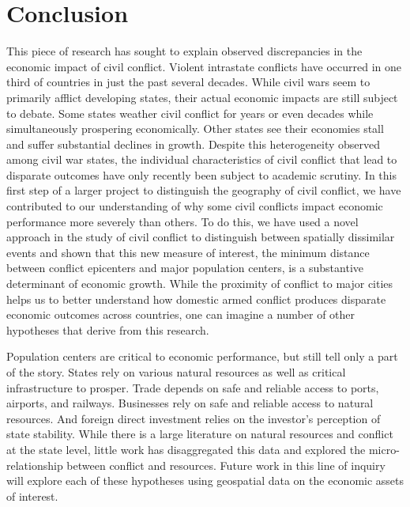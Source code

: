 \section{Conclusion}
\label{conclusion}

This piece of research has sought to explain observed discrepancies in the economic impact of civil conflict. Violent intrastate conflicts have occurred in one third of countries in just the past several decades. While civil wars seem to primarily afflict developing states, their actual economic impacts are still subject to debate. Some states weather civil conflict for years or even decades while simultaneously prospering economically. Other states see their economies stall and suffer substantial declines in growth. Despite this heterogeneity observed among civil war states, the individual characteristics of civil conflict that lead to disparate outcomes have only recently been subject to academic scrutiny. In this first step of a larger project to distinguish the geography of civil conflict, we have contributed to our understanding of why some civil conflicts impact economic performance more severely than others. To do this, we have used a novel approach in the study of civil conflict to distinguish between spatially dissimilar events and shown that this new measure of interest, the minimum distance between conflict epicenters and major population centers, is a substantive determinant of economic growth. While the proximity of conflict to major cities helps us to better understand how domestic armed conflict produces disparate economic outcomes across countries, one can imagine a number of other hypotheses that derive from this research.

Population centers are critical to economic performance, but still tell only a part of the story. States rely on various natural resources as well as critical infrastructure to prosper. Trade depends on safe and reliable access to ports, airports, and railways. Businesses rely on safe and reliable access to natural resources. And foreign direct investment relies on the investor's perception of state stability. While there is a large literature on natural resources and conflict at the state level, little work has disaggregated this data and explored the micro-relationship between conflict and resources. Future work in this line of inquiry will explore each of these hypotheses using geospatial data on the economic assets of interest.

